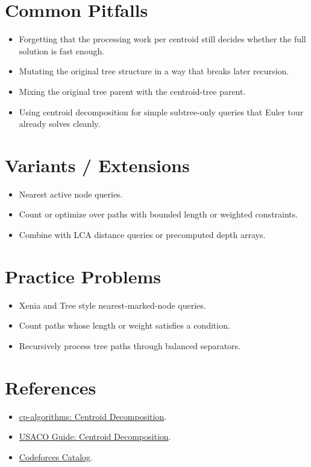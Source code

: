 \section*{Common Pitfalls}

\begin{itemize}
  \item Forgetting that the processing work per centroid still decides whether the full solution is fast enough.
  \item Mutating the original tree structure in a way that breaks later recursion.
  \item Mixing the original tree parent with the centroid-tree parent.
  \item Using centroid decomposition for simple subtree-only queries that Euler tour already solves cleanly.
\end{itemize}

\section*{Variants / Extensions}

\begin{itemize}
  \item Nearest active node queries.
  \item Count or optimize over paths with bounded length or weighted constraints.
  \item Combine with LCA distance queries or precomputed depth arrays.
\end{itemize}

\section*{Practice Problems}

\begin{itemize}
  \item Xenia and Tree style nearest-marked-node queries.
  \item Count paths whose length or weight satisfies a condition.
  \item Recursively process tree paths through balanced separators.
\end{itemize}

\section*{References}

\begin{itemize}
  \item \href{https://cp-algorithms.com/graph/centroid_decomposition.html}{cp-algorithms: Centroid Decomposition}.
  \item \href{https://usaco.guide/plat/centroid?lang=java}{USACO Guide: Centroid Decomposition}.
  \item \href{https://codeforces.com/catalog?locale=en}{Codeforces Catalog}.
\end{itemize}
